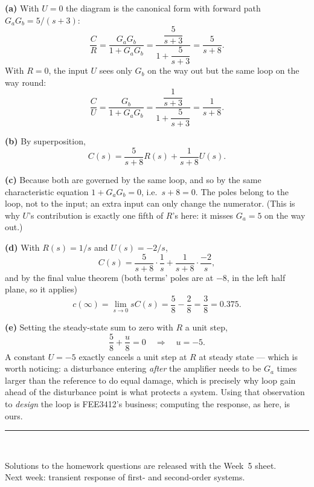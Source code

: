 \documentclass[11pt,a4paper]{article}
\newif\ifsolutions
\begin{document}
\begin{solution}
\textbf{(a)} With $U=0$ the diagram is the canonical form with forward path
$G_aG_b=5/(s+3)$:
\[
  \frac{C}{R}=\frac{G_aG_b}{1+G_aG_b}
   =\frac{\dfrac{5}{s+3}}{1+\dfrac{5}{s+3}}
   =\frac{5}{s+8} .
\]
With $R=0$, the input $U$ sees only $G_b$ on the way out but the same loop on
the way round:
\[
  \frac{C}{U}=\frac{G_b}{1+G_aG_b}
   =\frac{\dfrac{1}{s+3}}{1+\dfrac{5}{s+3}}
   =\frac{1}{s+8} .
\]

\medskip
\textbf{(b)} By superposition,
\[
  C(s)=\frac{5}{s+8}R(s)+\frac{1}{s+8}U(s) .
\]

\medskip
\textbf{(c)} Because both are governed by the same loop, and so by the same
characteristic equation $1+G_aG_b=0$, i.e.\ $s+8=0$. The poles belong to the
loop, not to the input; an extra input can only change the numerator. (This is
why $U$'s contribution is exactly one fifth of $R$'s here: it misses $G_a=5$ on
the way out.)

\medskip
\textbf{(d)} With $R(s)=1/s$ and $U(s)=-2/s$,
\[
  C(s)=\frac{5}{s+8}\cdot\frac{1}{s}+\frac{1}{s+8}\cdot\frac{-2}{s},
\]
and by the final value theorem (both terms' poles are at $-8$, in the left half
plane, so it applies)
\[
  c(\infty)=\lim_{s\to0}sC(s)=\frac{5}{8}-\frac{2}{8}=\frac{3}{8}=0.375 .
\]

\medskip
\textbf{(e)} Setting the steady-state sum to zero with $R$ a unit step,
\[
  \frac{5}{8}+\frac{u}{8}=0 \quad\Longrightarrow\quad u=-5 .
\]
A constant $U=-5$ exactly cancels a unit step at $R$ at steady state --- which
is worth noticing: a disturbance entering \emph{after} the amplifier needs to
be $G_a$ times larger than the reference to do equal damage, which is precisely
why loop gain ahead of the disturbance point is what protects a system. Using
that observation to \emph{design} the loop is FEE3412's business; computing the
response, as here, is ours.
\end{solution}

\vfill
\begin{center}
\rule{0.5\textwidth}{0.4pt}\\[4pt]
{\small\itshape
\ifsolutions
  End of solutions. Week~5: transient response of first- and second-order
  systems.
\else
  Solutions to the homework questions are released with the Week~5 sheet.\\
  Next week: transient response of first- and second-order systems.
\fi}
\end{center}
\end{document}
